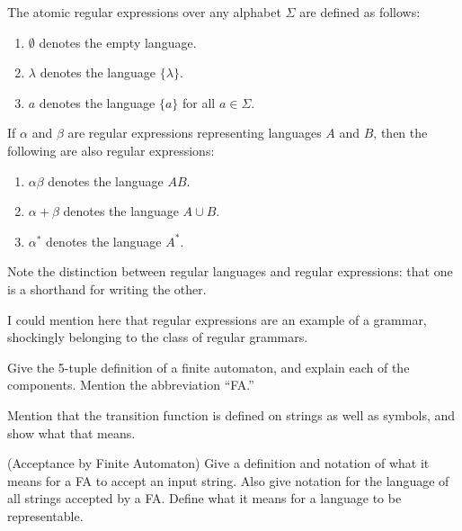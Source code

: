 \documentclass{bcthesis}
\renewcommand{\meo}{}
\begin{document}
	\begin{definition}
		The atomic regular expressions over any alphabet $\Sigma$ are defined as follows:
		\begin{enumerate}[label=(\roman*), itemsep = -0.3 ex]
			\item $\emptyset$ denotes the empty language.
			\item $\lambda$ denotes the language $\{ \lambda \}$.
			\item $a$ denotes the language $\{ a \}$ for all $a \in \Sigma$.
		\end{enumerate}

		If $\alpha$ and $\beta$ are regular expressions representing languages $A$ and $B$, then the following are also regular expressions:
		\begin{enumerate}[label=(\roman*), itemsep = -0.3 ex]
			\item $\alpha \beta$ denotes the language $AB$.
			\item $\alpha + \beta$ denotes the language $A \cup B$.
			\item $\alpha^*$ denotes the language $A^*$.
		\end{enumerate}
	\end{definition}

	\begin{remark}
		Note the distinction between regular languages and regular expressions: that one is a shorthand for writing the other.
	\end{remark}

	\meo{
		I could mention here that regular expressions are an example of a grammar, shockingly belonging to the class of regular grammars.
	}


\label{ch:finite_automata}


	\begin{definition}
		Give the 5-tuple definition of a finite automaton, and explain each of the components.
		Mention the abbreviation ``FA.''
	\end{definition}

	\begin{remark}
		Mention that the transition function is defined on strings as well as symbols, and show what that means.
	\end{remark}

	\begin{definition}(Acceptance by Finite Automaton)
		Give a definition and notation of what it means for a FA to accept an input string.
		Also give notation for the language of all strings accepted by a FA.
		Define what it means for a language to be representable.
	\end{definition}
\end{document}
